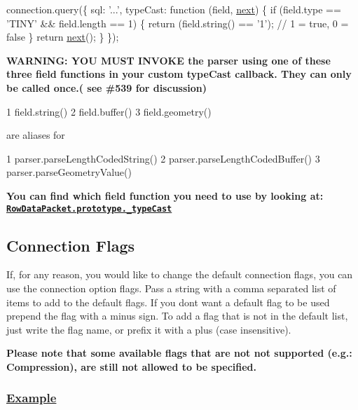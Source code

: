 \begin{DoxyCode}
connection.query(\{
  sql: \textcolor{stringliteral}{'...'},
  typeCast: \textcolor{keyword}{function} (field, \hyperlink{057__caller__graphs_8tcl_a3f808a00e1b937978455d707851ab33a}{next}) \{
    \textcolor{keywordflow}{if} (field.type == \textcolor{stringliteral}{'TINY'} && field.length == 1) \{
      \textcolor{keywordflow}{return} (field.string() == \textcolor{charliteral}{'1'}); \textcolor{comment}{// 1 = true, 0 = false}
    \}
    \textcolor{keywordflow}{return} \hyperlink{057__caller__graphs_8tcl_a3f808a00e1b937978455d707851ab33a}{next}();
  \}
\});
\end{DoxyCode}
 {\bfseries W\+A\+R\+N\+I\+N\+G\+: Y\+O\+U M\+U\+S\+T I\+N\+V\+O\+K\+E the parser using one of these three field functions in your custom type\+Cast callback. They can only be called once.( see \#539 for discussion)}


\begin{DoxyCode}
1 field.string()
2 field.buffer()
3 field.geometry()
\end{DoxyCode}
 are aliases for 
\begin{DoxyCode}
1 parser.parseLengthCodedString()
2 parser.parseLengthCodedBuffer()
3 parser.parseGeometryValue()
\end{DoxyCode}
 {\bfseries You can find which field function you need to use by looking at\+: \href{https://github.com/felixge/node-mysql/blob/master/lib/protocol/packets/RowDataPacket.js#L41}{\tt Row\+Data\+Packet.\+prototype.\+\_\+type\+Cast}}

\subsection*{Connection Flags}

If, for any reason, you would like to change the default connection flags, you can use the connection option {\ttfamily flags}. Pass a string with a comma separated list of items to add to the default flags. If you don\textquotesingle{}t want a default flag to be used prepend the flag with a minus sign. To add a flag that is not in the default list, just write the flag name, or prefix it with a plus (case insensitive).

{\bfseries Please note that some available flags that are not not supported (e.\+g.\+: Compression), are still not allowed to be specified.}

\subsubsection*{\hyperlink{struct_example}{Example}}

